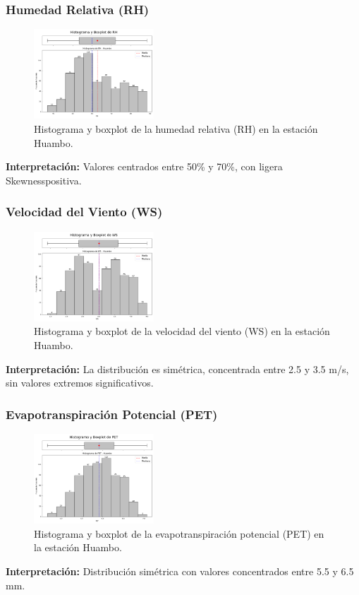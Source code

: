 \subsubsection*{Humedad Relativa (RH)}
\begin{figure}[H]
\centering
\includegraphics[width=0.4\textwidth]{resultados/por_estacion_meteorologica/Huambo/RH_histograma.png}
\caption{Histograma y boxplot de la humedad relativa (RH) en la estación Huambo.}
\label{fig:huambo_RH}
\end{figure}
\textbf{Interpretación:} Valores centrados entre 50\% y 70\%, con ligera Skewnesspositiva.

\subsubsection*{Velocidad del Viento (WS)}
\begin{figure}[H]
\centering
\includegraphics[width=0.4\textwidth]{resultados/por_estacion_meteorologica/Huambo/WS_histograma.png}
\caption{Histograma y boxplot de la velocidad del viento (WS) en la estación Huambo.}
\label{fig:huambo_WS}
\end{figure}
\textbf{Interpretación:} La distribución es simétrica, concentrada entre 2.5 y 3.5 m/s, sin valores extremos significativos.

\subsubsection*{Evapotranspiración Potencial (PET)}
\begin{figure}[H]
\centering
\includegraphics[width=0.4\textwidth]{resultados/por_estacion_meteorologica/Huambo/PET_histograma.png}
\caption{Histograma y boxplot de la evapotranspiración potencial (PET) en la estación Huambo.}
\label{fig:huambo_PET}
\end{figure}
\textbf{Interpretación:} Distribución simétrica con valores concentrados entre 5.5 y 6.5 mm.

